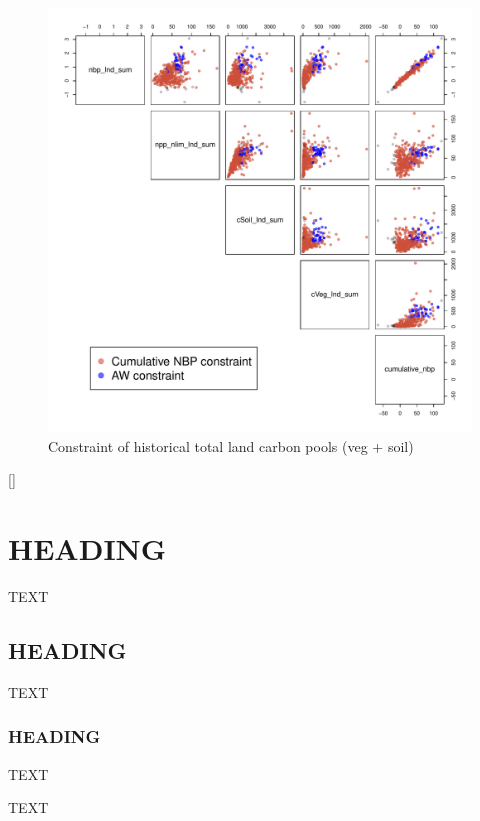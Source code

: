 \documentclass[gmd, manuscript]{copernicus}
\begin{document}
\begin{figure}[t]
\includegraphics[width=12cm]{./graphics/cumulative_nbp_constrained_pairs.pdf}
\caption{Constraint of historical total land carbon pools (veg + soil)}
\label{fig:total-land-carbon-sink-1}
\end{figure}
[]

\section{HEADING}
TEXT


\subsection{HEADING}
TEXT


\subsubsection{HEADING}
TEXT


\conclusions  %
TEXT


\end{document}
